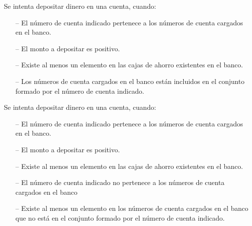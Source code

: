 \begin{tcolorbox}[colback=gray!5!white,colframe=gray!50!black,
  colbacktitle=gray!75!black,title=Depositar\_SP\_7]
  Se intenta depositar dinero en una cuenta, cuando:
     \begin{itemize}
        \item[--]{El número de cuenta indicado pertenece a los números de cuenta cargados en el banco.}
        \item[--]{El monto a depositar es positivo.}
        \item[--]{Existe al menos un elemento en las cajas de ahorro existentes en el banco.}
        \item[--]{Los números de cuenta cargados en el banco están incluidos en el conjunto formado por el número de cuenta indicado.}
     \end{itemize}
\end{tcolorbox}



\begin{tcolorbox}[colback=gray!5!white,colframe=gray!50!black,
  colbacktitle=gray!75!black,title=Depositar\_SP\_8]
  Se intenta depositar dinero en una cuenta, cuando:
     \begin{itemize}
        \item[--]{El número de cuenta indicado pertenece a los números de cuenta cargados en el banco.}
        \item[--]{El monto a depositar es positivo.}
        \item[--]{Existe al menos un elemento en las cajas de ahorro existentes en el banco.}
        \item[--]{El número de cuenta indicado no pertenece a los números de cuenta cargados en el banco}
        \item[--]{Existe al menos un elemento en los números de cuenta cargados en el banco que no está en el conjunto formado por el número de cuenta indicado.}
     \end{itemize}
\end{tcolorbox}

